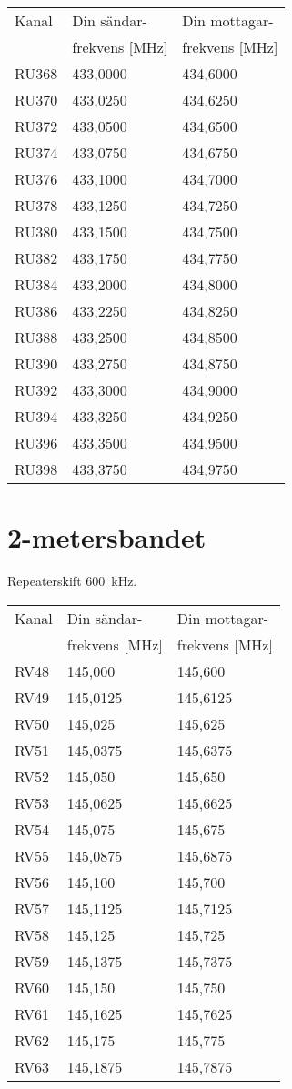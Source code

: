\begin{tabular}{ l | l | l }
  Kanal & Din sändar- & Din mottagar- \\
        & frekvens [MHz] & frekvens [MHz] \\
  \hline
  RU368 & 433,0000 & 434,6000 \\
  RU370 & 433,0250 & 434,6250 \\
  RU372 & 433,0500 & 434,6500 \\
  RU374 & 433,0750 & 434,6750 \\
  RU376 & 433,1000 & 434,7000 \\
  RU378 & 433,1250 & 434,7250 \\
  RU380 & 433,1500 & 434,7500 \\
  RU382 & 433,1750 & 434,7750 \\
  RU384 & 433,2000 & 434,8000 \\
  RU386 & 433,2250 & 434,8250 \\
  RU388 & 433,2500 & 434,8500 \\
  RU390 & 433,2750 & 434,8750 \\
  RU392 & 433,3000 & 434,9000 \\
  RU394 & 433,3250 & 434,9250 \\
  RU396 & 433,3500 & 434,9500 \\
  RU398 & 433,3750 & 434,9750 \\
\end{tabular}

\section{2-metersbandet}
Repeaterskift 600~kHz.

\begin{tabular}{ l | l | l }
  Kanal & Din sändar- & Din mottagar- \\
        & frekvens [MHz] & frekvens [MHz] \\
  \hline
  RV48 & 145,000 & 145,600 \\
  RV49 & 145,0125 & 145,6125 \\
  RV50 & 145,025 & 145,625 \\
  RV51 & 145,0375 & 145,6375 \\
  RV52 & 145,050 & 145,650 \\
  RV53 & 145,0625 & 145,6625 \\
  RV54 & 145,075 & 145,675 \\
  RV55 & 145,0875 & 145,6875 \\
  RV56 & 145,100 & 145,700 \\
  RV57 & 145,1125 & 145,7125 \\
  RV58 & 145,125 & 145,725 \\
  RV59 & 145,1375 & 145,7375 \\
  RV60 & 145,150 & 145,750 \\
  RV61 & 145,1625 & 145,7625 \\
  RV62 & 145,175 & 145,775 \\
  RV63 & 145,1875 & 145,7875 \\
\end{tabular}

